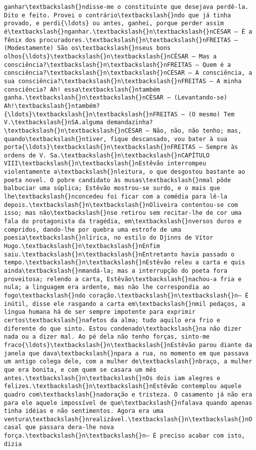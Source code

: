 \begin{Verbatim}[commandchars=\\\{\}]
ganhar\textbackslash{}ndisse-me o constituinte que desejava perdê-la. Dito e feito. Provei o contrário\textbackslash{}ndo que já tinha provado, e perdi{\ldots} ou antes, ganhei, porque perder assim é\textbackslash{}nganhar.\textbackslash{}n\textbackslash{}nCÉSAR — É a fênix dos procuradores.\textbackslash{}n\textbackslash{}nFREITAS — (Modestamente) São os\textbackslash{}nseus bons olhos{\ldots}\textbackslash{}n\textbackslash{}nCÉSAR — Mas a consciência?\textbackslash{}n\textbackslash{}nFREITAS — Quem é a consciência?\textbackslash{}n\textbackslash{}nCÉSAR — A consciência, a sua consciência?\textbackslash{}n\textbackslash{}nFREITAS — A minha consciência? Ah! essa\textbackslash{}ntambém ganha.\textbackslash{}n\textbackslash{}nCÉSAR — (Levantando-se) Ah!\textbackslash{}ntambém?{\ldots}\textbackslash{}n\textbackslash{}nFREITAS — (O mesmo) Tem V.\textbackslash{}nSA.alguma demandazinha?\textbackslash{}n\textbackslash{}nCÉSAR — Não, não, não tenho; mas, quando\textbackslash{}ntiver, fique descansado, vou bater à sua porta{\ldots}\textbackslash{}n\textbackslash{}nFREITAS — Sempre às ordens de V. Sa.\textbackslash{}n\textbackslash{}nCAPÍTULO VIII\textbackslash{}n\textbackslash{}nEstêvão interrompeu violentamente a\textbackslash{}nleitura, o que desgostou bastante ao poeta novel. O pobre candidato às musas\textbackslash{}nmal pôde balbuciar uma súplica; Estêvão mostrou-se surdo, e o mais que lhe\textbackslash{}nconcedeu foi ficar com a comédia para lê-la depois.\textbackslash{}n\textbackslash{}nOliveira contentou-se com isso; mas não\textbackslash{}nse retirou sem recitar-lhe de cor uma fala do protagonista da tragédia, em\textbackslash{}nversos duros e compridos, dando-lhe por quebra uma estrofe de uma poesia\textbackslash{}nlírica, no estilo do Djinns de Vítor Hugo.\textbackslash{}n\textbackslash{}nEnfim saiu.\textbackslash{}n\textbackslash{}nEntretanto havia passado o tempo.\textbackslash{}n\textbackslash{}nEstêvão releu a carta e quis ainda\textbackslash{}nmandá-la; mas a interrupção do poeta fora proveitosa; relendo a carta, Estêvão\textbackslash{}nachou-a fria e nula; a linguagem era ardente, mas não lhe correspondia ao fogo\textbackslash{}ndo coração.\textbackslash{}n\textbackslash{}n— É inútil, disse ele rasgando a carta em\textbackslash{}nmil pedaços, a língua humana há de ser sempre impotente para exprimir certos\textbackslash{}nafetos da alma; tudo aquilo era frio e diferente do que sinto. Estou condenado\textbackslash{}na não dizer nada ou a dizer mal. Ao pé dela não tenho forças, sinto-me fraco{\ldots}\textbackslash{}n\textbackslash{}nEstêvão parou diante da janela que dava\textbackslash{}npara a rua, no momento em que passava um antigo colega dele, com a mulher de\textbackslash{}nbraço, a mulher que era bonita, e com quem se casara um mês antes.\textbackslash{}n\textbackslash{}nOs dois iam alegres e felizes.\textbackslash{}n\textbackslash{}nEstêvão contemplou aquele quadro com\textbackslash{}nadoração e tristeza. O casamento já não era para ele aquele impossível de que\textbackslash{}nfalava quando apenas tinha idéias e não sentimentos. Agora era uma ventura\textbackslash{}nrealizável.\textbackslash{}n\textbackslash{}nO casal que passara dera-lhe nova força.\textbackslash{}n\textbackslash{}n— É preciso acabar com isto, dizia 
\end{Verbatim}
